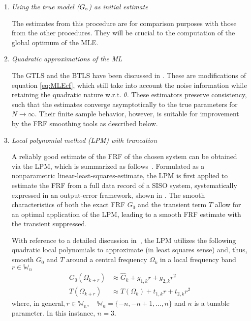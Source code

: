 \begin{enumerate}
\item
\emph{Using the true model (${G}_{\circ}$) as initial estimate}

The estimates from this procedure are for comparison purposes with those from the other procedures. They will be crucial to the computation of the global optimum of the \gls{MLE}.

\item
\emph{Quadratic approximations of the ML}


The \gls{GTLS} and the \gls{BTLS} have been discussed in \citep{Pintelon1998}. These are modifications of equation \eqref{eq:MLEcf}, which still take into account the noise information while retaining the quadratic nature w.r.t. $\theta$. 
These estimators preserve consistency, such that the estimates converge asymptotically to the true parameters for $N\to\infty$. 
Their finite sample behavior, however, is suitable for improvement by the \gls{FRF} smoothing tools as described below.

\item
\emph{Local polynomial method (LPM) with truncation}

A reliably good estimate of the FRF of the chosen system can be obtained via the LPM, which is summarized as follows~\citep{Lumori2014TIM}. Formulated as a nonparametric linear-least-squares-estimate, the LPM is first applied to estimate the FRF from a full data record of a SISO system, systematically expressed in an output-error framework, shown in . The smooth characteristics of both the exact \gls{FRF} $G_0$ and the transient term $T$ allow for an optimal application of the \gls{LPM}, leading to a smooth \gls{FRF} estimate with the transient suppressed.

  With reference to a detailed discussion in~\citep{Lumori2014TIM}, the \gls{LPM} utilizes the following quadratic local polynomials to approximate (in least squares sense) and, thus, smooth $G_0$ and $T$ around a central frequency $\Omega_{k}$ in a local frequency band $r\in\mathbb{W}_n$
\begin{subequations}\label{lpmImplQuadG}
\begin{align}
G_0(\Omega_{k+r})&\approx \hat G_k + g_{1,k} r + g_{2,k}r^2
\\
T(\Omega_{k+r})&\approx T(\Omega_k)+t_{1,k}r + t_{2,k}r^2\label{lpmImplQuadT}
\end{align}
\end{subequations}
where, in general,$\ r\in\mathbb{W}_n,\quad$$\mathbb{W}_n = \{-n,-n+1,\dots,n\}$ and $n$ is a tunable parameter. 
In this instance, $n=3$.


\end{enumerate}
